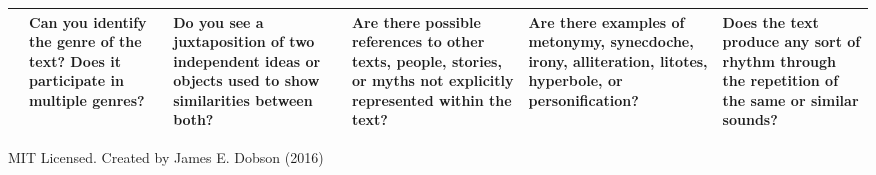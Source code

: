 \documentclass[12pt]{article}
\begin{document}
\begin{table}[ht]
\begin{tabular}{| m{2mm} *{5}{|m{1.75in}} |}
\centering\parbox[t]{2mm}{} &

Can you identify the genre of the text? Does it participate in multiple
genres?& 

Do you see a juxtaposition of two independent ideas or objects used to show
similarities between both? &

Are there possible references to other texts, people, stories, or myths not
explicitly represented within the text? \newline&

Are there examples of metonymy, synecdoche, irony, alliteration, litotes,
hyperbole, or personification?&

Does the text produce any sort of rhythm through the repetition of the same or
similar sounds? \\ \hline

\end{tabular}
\end{table}
\vspace*{1in}
\begin{center}
\small{MIT Licensed. Created by James E. Dobson (2016)}
\end{center}
\end{document}
